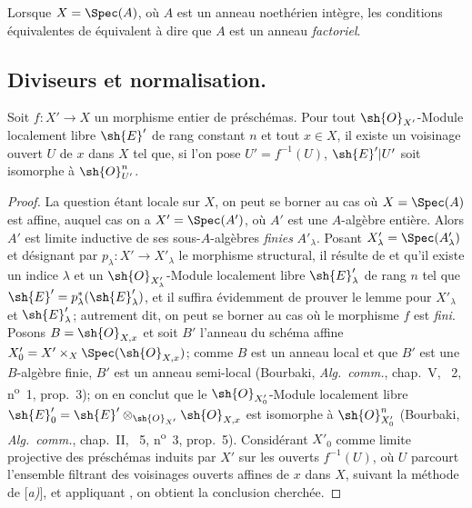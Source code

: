 \begin{remark}[21.7.7]
\label{IV.21.7.7}
Lorsque $X=\Spec(A)$, où $A$ est un anneau noethérien intègre, les conditions équivalentes de  équivalent à dire que $A$ est un anneau \emph{factoriel}.
\end{remark}

\subsection{Diviseurs et normalisation.}

\begin{lemma}[21.8.1]
\label{IV.21.8.1}
Soit $f:X'\to X$ un morphisme entier de préschémas.
Pour tout $\sh{O}_{X'}$-Module localement libre $\sh{E}'$ de rang constant $n$ et tout $x\in X$, il existe un voisinage ouvert $U$ de $x$ dans $X$ tel que, si l'on pose $U'=f^{-1}(U)$, $\sh{E}'|U'$ soit isomorphe à $\sh{O}_{U'}^n$.
\end{lemma}

\begin{proof}
La question étant locale sur $X$, on peut se borner au cas où $X=\Spec(A)$ est affine, auquel cas on a $X'=\Spec(A')$, où $A'$ est une $A$-algèbre entière.
Alors $A'$ est limite inductive de ses sous-$A$-algèbres \emph{finies} $A'_\lambda$.
Posant $X'_\lambda=\Spec(A'_\lambda)$ et désignant par $p_\lambda:X'\to X'_\lambda$ le morphisme structural, il résulte de  et  qu'il existe un indice $\lambda$ et un $\sh{O}_{X'_\lambda}$-Module localement libre $\sh{E}'_\lambda$ de rang $n$ tel que $\sh{E}'=p_\lambda^*(\sh{E}'_\lambda)$, et il suffira évidemment de prouver le lemme pour $X'_\lambda$ et $\sh{E}'_\lambda$;
autrement dit, on peut se borner au cas où le morphisme $f$ est \emph{fini}.
Posons $B=\sh{O}_{X,x}$ et soit $B'$ l'anneau du schéma affine $X'_0=X'\times_X\Spec(\sh{O}_{X,x})$;
comme $B$ est un anneau local et que $B'$ est une $B$-algèbre finie, $B'$ est un anneau semi-local (Bourbaki, \emph{Alg.\ comm.}, chap.~V, \textsection~2, n\textsuperscript{o}~1, prop.~3);
on en conclut que le $\sh{O}_{X'_0}$-Module localement libre $\sh{E}'_0=\sh{E}'\otimes_{\sh{O}_{X'}}\sh{O}_{X,x}$ est isomorphe à $\sh{O}_{X'_0}^n$ (Bourbaki, \emph{Alg.\ comm.}, chap.~II, \textsection~5, n\textsuperscript{o}~3, prop.~5).
Considérant $X'_0$ comme limite
projective des préschémas induits par $X'$ sur les ouverts $f^{-1}(U)$, où $U$ parcourt l'ensemble filtrant des voisinages ouverts affines de $x$ dans $X$, suivant la méthode de [\emph{a)}], et appliquant , on obtient la conclusion cherchée.
\end{proof}

